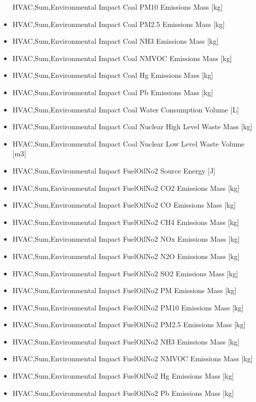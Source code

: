 \begin{itemize}
  HVAC,Sum,Environmental Impact Coal PM10 Emissions Mass {[}kg{]}
\item
  HVAC,Sum,Environmental Impact Coal PM2.5 Emissions Mass {[}kg{]}
\item
  HVAC,Sum,Environmental Impact Coal NH3 Emissions Mass {[}kg{]}
\item
  HVAC,Sum,Environmental Impact Coal NMVOC Emissions Mass {[}kg{]}
\item
  HVAC,Sum,Environmental Impact Coal Hg Emissions Mass {[}kg{]}
\item
  HVAC,Sum,Environmental Impact Coal Pb Emissions Mass {[}kg{]}
\item
  HVAC,Sum,Environmental Impact Coal Water Consumption Volume {[}L{]}
\item
  HVAC,Sum,Environmental Impact Coal Nuclear High Level Waste Mass {[}kg{]}
\item
  HVAC,Sum,Environmental Impact Coal Nuclear Low Level Waste Volume {[}m3{]}
\item
  HVAC,Sum,Environmental Impact FuelOilNo2 Source Energy {[}J{]}
\item
  HVAC,Sum,Environmental Impact FuelOilNo2 CO2 Emissions Mass {[}kg{]}
\item
  HVAC,Sum,Environmental Impact FuelOilNo2 CO Emissions Mass {[}kg{]}
\item
  HVAC,Sum,Environmental Impact FuelOilNo2 CH4 Emissions Mass {[}kg{]}
\item
  HVAC,Sum,Environmental Impact FuelOilNo2 NOx Emissions Mass {[}kg{]}
\item
  HVAC,Sum,Environmental Impact FuelOilNo2 N2O Emissions Mass {[}kg{]}
\item
  HVAC,Sum,Environmental Impact FuelOilNo2 SO2 Emissions Mass {[}kg{]}
\item
  HVAC,Sum,Environmental Impact FuelOilNo2 PM Emissions Mass {[}kg{]}
\item
  HVAC,Sum,Environmental Impact FuelOilNo2 PM10 Emissions Mass {[}kg{]}
\item
  HVAC,Sum,Environmental Impact FuelOilNo2 PM2.5 Emissions Mass {[}kg{]}
\item
  HVAC,Sum,Environmental Impact FuelOilNo2 NH3 Emissions Mass {[}kg{]}
\item
  HVAC,Sum,Environmental Impact FuelOilNo2 NMVOC Emissions Mass {[}kg{]}
\item
  HVAC,Sum,Environmental Impact FuelOilNo2 Hg Emissions Mass {[}kg{]}
\item
  HVAC,Sum,Environmental Impact FuelOilNo2 Pb Emissions Mass {[}kg{]}

\end{itemize}
